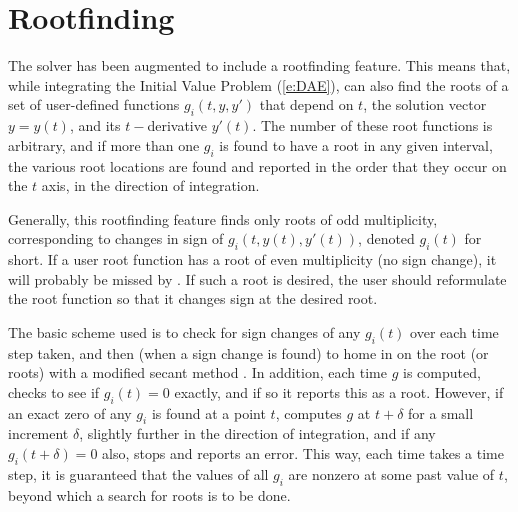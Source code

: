 \section{Rootfinding}\label{s:rootfinding}

The {\idas} solver has been augmented to include a rootfinding
feature.  This means that, while integrating the Initial Value Problem
(\ref{e:DAE}), {\idas} can also find the roots of a set of user-defined
functions $g_i(t,y,y')$ that depend on $t$, the solution vector 
$y = y(t)$, and its $t-$derivative $y'(t)$.  The number of these root
functions is arbitrary, and if more than one $g_i$ is found to have a
root in any given interval, the various root locations are found and
reported in the order that they occur on the $t$ axis, in the
direction of integration.

Generally, this rootfinding feature finds only roots of odd
multiplicity, corresponding to changes in sign of $g_i(t,y(t),y'(t))$,
denoted $g_i(t)$ for short.  If a user root function has a root of
even multiplicity (no sign change), it will probably be missed by
{\idas}.  If such a root is desired, the user should reformulate the
root function so that it changes sign at the desired root.

The basic scheme used is to check for sign changes of any $g_i(t)$ over
each time step taken, and then (when a sign change is found) to home
in on the root (or roots) with a modified secant method \cite{HeSh:80}.  
In addition, each time $g$ is computed, {\idas} checks to see if 
$g_i(t) = 0$ exactly, and if so it reports this as a root.  However,
if an exact zero of any $g_i$ is found at a point $t$, {\idas}
computes $g$ at $t + \delta$ for a small increment $\delta$, slightly
further in the direction of integration, and if any $g_i(t + \delta)=0$ 
also, {\idas} stops and reports an error.  This way, each time
{\idas} takes a time step, it is guaranteed that the values of all
$g_i$ are nonzero at some past value of $t$, beyond which a search for
roots is to be done.

